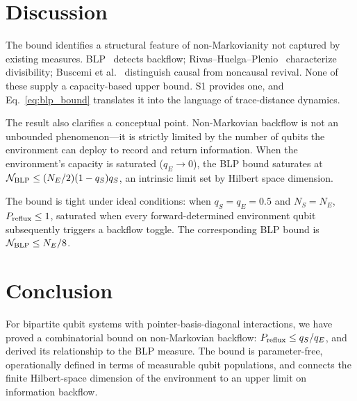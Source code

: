 \documentclass[aps,prl,twocolumn,superscriptaddress,hyperref]{revtex4-2}
\begin{document}
\section{Discussion}

The bound identifies a structural feature of non-Markovianity not captured by existing measures. BLP~\cite{Breuer:2009} detects backflow; Rivas--Huelga--Plenio~\cite{Rivas:2010} characterize divisibility; Buscemi et al.~\cite{Buscemi:2025} distinguish causal from noncausal revival. None of these supply a capacity-based upper bound. S1 provides one, and Eq.~\eqref{eq:blp_bound} translates it into the language of trace-distance dynamics.

The result also clarifies a conceptual point. Non-Markovian backflow is not an unbounded phenomenon---it is strictly limited by the number of qubits the environment can deploy to record and return information. When the environment's capacity is saturated ($q_E \to 0$), the BLP bound saturates at $\mathcal{N}_{\rm BLP} \leq (N_E/2)(1-q_S)q_S$, an intrinsic limit set by Hilbert space dimension.

The bound is tight under ideal conditions: when $q_S = q_E = 0.5$ and $N_S = N_E$, $P_{\rm reflux} \leq 1$, saturated when every forward-determined environment qubit subsequently triggers a backflow toggle. The corresponding BLP bound is $\mathcal{N}_{\rm BLP} \leq N_E/8$.

\section{Conclusion}

For bipartite qubit systems with pointer-basis-diagonal interactions, we have proved a combinatorial bound on non-Markovian backflow: $P_{\rm reflux} \leq q_S/q_E$, and derived its relationship to the BLP measure. The bound is parameter-free, operationally defined in terms of measurable qubit populations, and connects the finite Hilbert-space dimension of the environment to an upper limit on information backflow.
\end{document}
